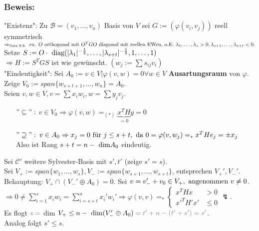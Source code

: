 \documentclass[a4paper, 12pt]{extarticle}
\newcommand{\twopartdef}[4] {
	\left\{
		\begin{array}{ll}
			#1 & #2 \\
			#3 & #4
		\end{array}
	\right.
}
\newcommand{\tn}[1]{\textnormal {#1}}
\newcommand{\transp}[2][50]{\color{black!#1}#2}
\begin{document}
\subsubsection*{Beweis:}
"Existenz": Zu $\mathcal{B} = (v_1, \dots, v_n)$ Basis von $V$ sei $G := (\varphi(v_i, v_j))$ reell symmetrisch $\Rightarrow_{\tn{Satz 9.8.}} \tn{ ex. } O \tn{ orthogonal mit } O^TGO \tn{ diagonal mit reellen EWen, o.E. } \lambda_1, \dots, \lambda_s > 0, \lambda_{s+1}, \dots, \lambda_{s+t} < 0.$\\
Setze $S := O \cdot \tn{ diag}(|\lambda_1|^{-\frac{1}{2}}, \dots, |\lambda_{s+t}|^{-\frac{1}{2}}, 1, \dots, 1)$\\
$\Rightarrow H := S^TGS$ ist wie gewünscht. $(w_j := \sum s_{ij}v_i)$\\
"Eindeutigkeit": Sei $A_0 := {v\in V | \varphi(v, w) = 0 \forall w \in V}$ \textbf{Ausartungsraum} von $\varphi$.\\
Zeige $V_0 := span\{w_{s+t+1}, \dots, w_{n}\} = A_0.$\\
Seien $v, w \in V, v = \sum x_iw_i,  w = \sum y_jv_j.$\\
\begin{itemize}
	\item[$"\subseteq":$] $v\in V_0 \Rightarrow \varphi(v, w) =_{(\ast)} \underbrace{x^TH}_{=0}y = 0$
	\item[$"\supseteq":$] $v \in A_0 \Rightarrow x_j = 0 \tn{ für } j \leq s+t, \tn{ da } 0 = \varphi(v, w_j) =_{\ast} x^THe_j = \pm x_j$\\
	Also ist Rang $s+t = n - \tn{ dim}A_0$ eindeutig.
\end{itemize}
Sei $\mathcal{C'}$ weitere Sylvester-Basis mit $s', t'$ (zeige $s' = s$).\\
Sei $V_+ := span\{w_1, \dots, w_s\}, V_- := span\{w_{s+1}, \dots, w_{s+t}\}$, entsprechen $V_+', V_-'$.\\
Behauptung: $V_+\cap (V_-'\oplus A_0) = 0$. Sei $v = v_-'+v_0 \in V_+, \tn{ angenommen } v \neq 0$.\\
$\Rightarrow 0 \neq \sum_{i=1}^{s}x_iw_i = \sum_{i=s+t}^{n}x_i'w_i' \Rightarrow \varphi(v, v) =_{\ast} \twopartdef{x^THx}{> 0}{x'^TH'x'}{\leq 0} \lightning$.\\
Es flogt $\transp{s = }$ dim $V_+ \leq n - \tn{ dim}(V_-'\oplus A_0) \transp{ = t' + n - (t'+s')} = s'$.\\
Analog folgt $s' \leq s$.\newpage
\end{document}
